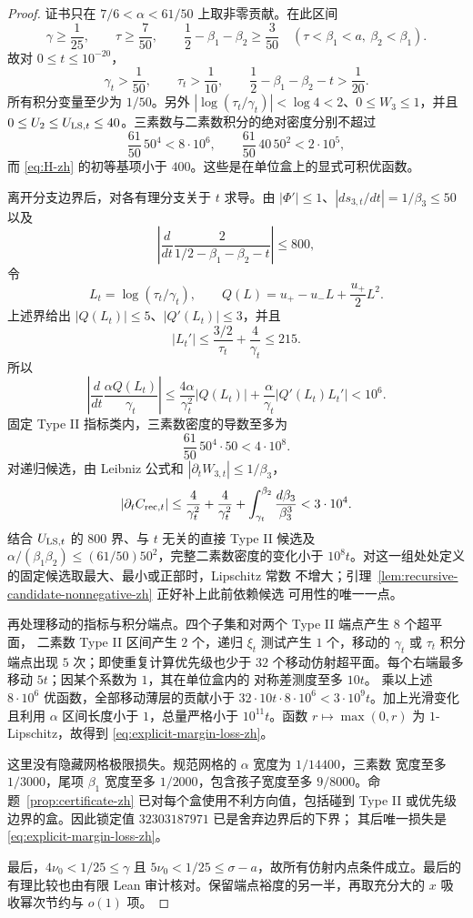 \documentclass[UTF8,10pt,a4paper]{ctexart}
\newcommand{\1}{\mathbf{1}}
\theoremstyle{remark}
\begin{document}
\begin{proof}
证书只在 $7/6<\alpha<61/50$ 上取非零贡献。在此区间
\[
 \gamma\ge\frac1{25},\qquad \tau\ge\frac7{50},\qquad
 \frac12-\beta_1-\beta_2\ge\frac3{50}
 \quad(\tau<\beta_1<a,\ \beta_2<\beta_1).
\]
故对 $0\le t\le10^{-20}$，
\[
 \gamma_t>\frac1{50},\qquad \tau_t>\frac1{10},\qquad
 \frac12-\beta_1-\beta_2-t>\frac1{20}.
\]
所有积分变量至少为 $1/50$。另外
$|\log(\tau_t/\gamma_t)|<\log4<2$、$0\le W_3\le1$，并且
$0\le U_2\le U_{{\rm LS},t}\le40$。三素数与二素数积分的绝对密度分别不超过
\[
 \frac{61}{50}\,50^4<8\cdot10^6,\qquad
 \frac{61}{50}\,40\,50^2<2\cdot10^5,
\]
而 \eqref{eq:H-zh} 的初等基项小于 $400$。这些是在单位盒上的显式可积优函数。

离开分支边界后，对各有理分支关于 $t$ 求导。由
$|\Phi'|\le1$、$|d s_{3,t}/dt|=1/\beta_3\le50$ 以及
\[
 \left|\frac d{dt}\frac2{1/2-\beta_1-\beta_2-t}\right|\le800,
\]
令
\[
 L_t=\log(\tau_t/\gamma_t),\qquad
 Q(L)=u_+-u_-L+\frac{u_+}{2}L^2.
\]
上述界给出 $|Q(L_t)|\le5$、$|Q'(L_t)|\le3$，并且
\[
 |L_t'|\le\frac{3/2}{\tau_t}+\frac4{\gamma_t}\le215.
\]
所以
\[
 \left|\frac d{dt}\frac{\alpha Q(L_t)}{\gamma_t}\right|
 \le\frac{4\alpha}{\gamma_t^2}|Q(L_t)|
 +\frac{\alpha}{\gamma_t}|Q'(L_t)L_t'|<10^6.
\]
固定 Type II 指标类内，三素数密度的导数至多为
\[
 \frac{61}{50}\,50^4\cdot50<4\cdot10^8.
\]
对递归候选，由 Leibniz 公式和
$|\partial_tW_{3,t}|\le1/\beta_3$，
\[
 |\partial_t C_{{\rm rec},t}|
 \le\frac4{\gamma_t^2}+\frac4{\gamma_t^2}
 +\int_{\gamma_t}^{\beta_2}\frac{d\beta_3}{\beta_3^3}
 <3\cdot10^4.
\]
结合 $U_{{\rm LS},t}$ 的 $800$ 界、与 $t$ 无关的直接 Type II 候选及
$\alpha/(\beta_1\beta_2)\le(61/50)50^2$，完整二素数密度的变化小于
$10^8t$。对这一组处处定义的固定候选取最大、最小或正部时，Lipschitz 常数
不增大；引理~\ref{lem:recursive-candidate-nonnegative-zh} 正好补上此前依赖候选
可用性的唯一一点。

再处理移动的指标与积分端点。四个子集和对两个 Type II 端点产生 $8$ 个超平面，
二素数 Type II 区间产生 $2$ 个，递归 $\xi_t$ 测试产生 $1$ 个，移动的
$\gamma_t$ 或 $\tau_t$ 积分端点出现 $5$ 次；即使重复计算优先级也少于 $32$
个移动仿射超平面。每个右端最多移动 $5t$；因某个系数为 $1$，其在单位盒内的
对称差测度至多 $10t$。
乘以上述 $8\cdot10^6$ 优函数，全部移动薄层的贡献小于
$32\cdot10t\cdot8\cdot10^6<3\cdot10^9t$。加上光滑变化且利用
$\alpha$ 区间长度小于 $1$，总量严格小于 $10^{11}t$。函数
$r\mapsto\max(0,r)$ 为 $1$-Lipschitz，故得到
\eqref{eq:explicit-margin-loss-zh}。

这里没有隐藏网格极限损失。规范网格的 $\alpha$ 宽度为 $1/14400$，三素数
宽度至多 $1/3000$，尾项 $\beta_1$ 宽度至多 $1/2000$，包含孩子宽度至多
$9/8000$。命题~\ref{prop:certificate-zh} 已对每个盒使用不利方向值，包括碰到
Type II 或优先级边界的盒。因此锁定值 $32303187971$ 已是舍弃边界后的下界；
其后唯一损失是 \eqref{eq:explicit-margin-loss-zh}。

最后，$4\nu_0<1/25\le\gamma$ 且
$5\nu_0<1/25\le\sigma-a$，故所有仿射内点条件成立。最后的有理比较也由有限
Lean 审计核对。保留端点裕度的另一半，再取充分大的 $x$ 吸收幂次节约与
$o(1)$ 项。
\end{proof}
\end{document}
